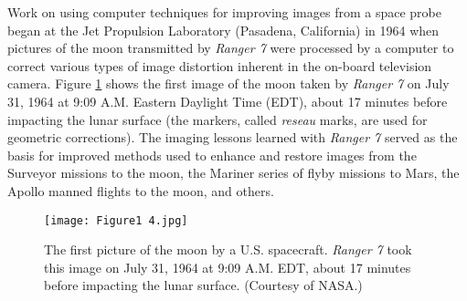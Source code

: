 \documentclass[a4paper,10pt,twoside]{book}
\begin{document}
Work on using computer techniques for improving images from a space probe began at the Jet Propulsion Laboratory (Pasadena, California) in 1964 when pictures of the moon transmitted by \textit{Ranger 7} were processed by a computer to correct various types of image distortion inherent in the on-board television camera. Figure \ref{Figure:1.4} shows the first image of the moon taken by \textit{Ranger 7} on July 31, 1964 at 9:09 {\footnotesize A.M.} Eastern Daylight Time (EDT), about 17 minutes before impacting the lunar surface (the markers, called \textit{reseau} marks, are used for geometric corrections). The imaging lessons learned with \textit{Ranger 7} served as the basis for improved methods used to enhance and restore images from the Surveyor missions to the moon, the Mariner series of flyby missions to Mars, the Apollo manned flights to the moon, and others.

\begin{figure}[htbp]
    \centering
    \texttt{[image: Figure1 4.jpg]}
    \caption{The first picture of the moon by a U.S. spacecraft. \textit{Ranger 7} took this image on July 31, 1964 at 9:09 {\footnotesize A.M.} EDT, about 17 minutes before impacting the lunar surface. (Courtesy of NASA.)}
    \label{Figure:1.4}
\end{figure}

\end{document}
